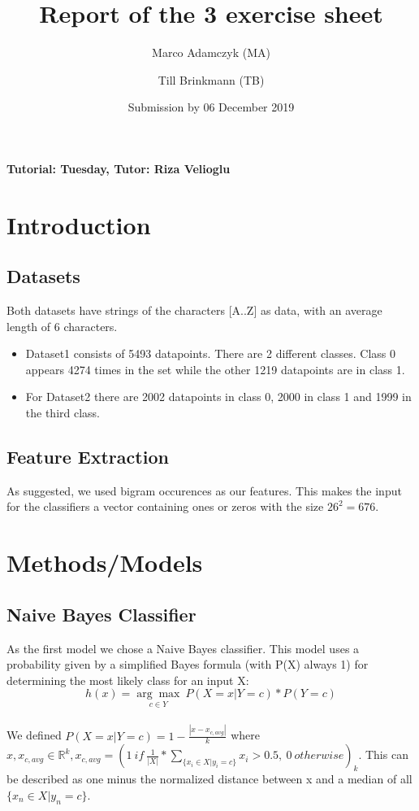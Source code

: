 \documentclass[a4paper,12pt]{article}
\title{Report of the 3\ts{rd} exercise sheet}
\author{Marco Adamczyk (MA) \and Till Brinkmann (TB)}
\date{Submission by 06\ts{th} December 2019}
\newcommand{\initials}[1]{\marginpar{\quad\texttt{#1}}}
\begin{document}

\pagestyle{myheadings}
    
\maketitle

\begin{center}
    \textbf{Tutorial: Tuesday, Tutor: Riza Velioglu}
\end{center}

\section{Introduction}
\subsection{Datasets}
Both datasets have strings of the characters [A..Z] as data, with an average length of 6 characters.
\begin{itemize}
	\item Dataset1 consists of 5493 datapoints. There are 2 different classes. Class 0 appears 4274 times in the set while the other 1219 datapoints are in class 1.
	\item For Dataset2 there are 2002 datapoints in class 0, 2000 in class 1 and 1999 in the third class.
\end{itemize}
\initials{TB}
\subsection{Feature Extraction}
As suggested, we used bigram occurences as our features. This makes the input for the classifiers a vector containing ones or zeros with the size $26^2=676 $.
\initials{TB}

\section{Methods/Models}
\subsection{Naive Bayes Classifier}
	As the first model we chose a Naive Bayes classifier. This model uses a probability given by a simplified Bayes formula (with P(X) always 1) for determining the most likely class for an input X: $$h(x) = \underset{c \in Y}{\arg \max}\ P(X = x | Y = c)*P(Y=c)$$\\
	We defined $P(X = x | Y = c) = 1 - \frac{|x-x_{c,avg}|}{k}$ where $ x,x_{c,avg} \in \mathbb{R}^k, x_{c,avg} = (1\ if\ \frac{1}{|X|}*\sum_{\{x_i \in X | y_i=c\}} x_i > 0.5,\ 0\ otherwise)_k$. This can be described as one minus the normalized distance between x and a median of all $\{x_n \in X| y_n = c\}$.
\initials{TB}
\end{document}
